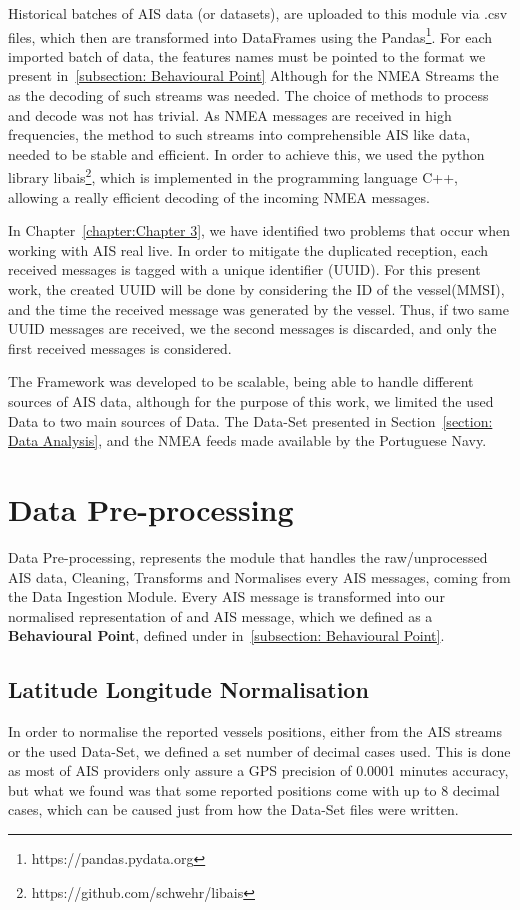 Historical batches of AIS data (or datasets), are uploaded to this module via .csv files, which then are transformed into DataFrames using the Pandas\footnote{https://pandas.pydata.org}. For each imported batch of data, the features names must be pointed to the format we present in~\ref{subsection: Behavioural Point}
Although for the NMEA Streams the as the decoding of such streams was needed. The choice of methods to process and decode was not has trivial. As NMEA messages are received in high frequencies, the method to such streams into comprehensible AIS like data, needed to be stable and efficient. In order to achieve this, we used the python library libais\footnote{https://github.com/schwehr/libais}, which is implemented in the programming language C++, allowing a really efficient decoding of the incoming NMEA messages. 

In Chapter~\ref{chapter:Chapter 3}, we have identified two problems that occur when working with AIS real live. In order to mitigate the duplicated reception, each received messages is tagged with a unique identifier (UUID). For this present work, the created UUID will be done by considering the ID of the vessel(MMSI), and the time the received message was generated by the vessel. Thus, if two same UUID messages are received, we the second messages is discarded, and only the first received messages is considered.

The Framework was developed to be scalable, being able to handle different sources of AIS data, although for the purpose of this work, we limited the used Data to two main sources of Data. The Data-Set presented in Section~\ref{section: Data Analysis}, and the NMEA feeds made available by the Portuguese Navy.


\section{Data Pre-processing}
Data Pre-processing, represents the module that handles the raw/unprocessed AIS data, Cleaning, Transforms and Normalises every AIS messages, coming from the Data Ingestion Module. Every AIS message is transformed into our normalised representation of and AIS message, which we defined as a \textbf{Behavioural Point}, defined under in~\ref{subsection: Behavioural Point}.

\subsection{Latitude Longitude Normalisation}
In order to normalise the reported vessels positions, either from the AIS streams or the used Data-Set, we defined a set number of decimal cases used. This is done as most of AIS providers only assure a GPS precision of 0.0001 minutes accuracy, but what we found was that some reported positions come with up to 8 decimal cases, which can be caused just from how the Data-Set files were written.

